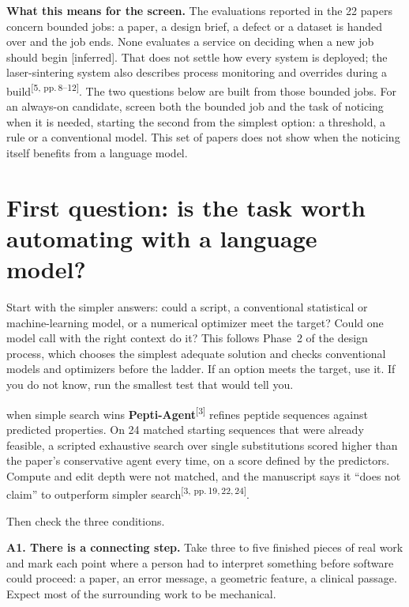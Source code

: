 \documentclass[10pt]{article}
\newcommand{\inferred}{\textsf{\small[inferred]}}
\newcommand{\p}[1]{\textsuperscript{[#1]}}
\begin{document}
\textbf{What this means for the screen.}
The evaluations reported in the 22 papers concern bounded jobs: a paper, a design brief, a defect or a dataset is handed over and the job ends. None evaluates a service on deciding when a new job should begin \inferred.
That does not settle how every system is deployed; the laser-sintering system also describes process monitoring and overrides during a build\p{5, pp.\,8--12}.
The two questions below are built from those bounded jobs.
For an always-on candidate, screen both the bounded job and the task of noticing when it is needed, starting the second from the simplest option: a threshold, a rule or a conventional model.
This set of papers does not show when the noticing itself benefits from a language model.

\section{First question: is the task worth automating with a language model?}

Start with the simpler answers: could a script, a conventional statistical or machine-learning model, or a numerical optimizer meet the target? Could one model call with the right context do it?
This follows Phase~2 of the design process, which chooses the simplest adequate solution and checks conventional models and optimizers before the ladder.
If an option meets the target, use it. If you do not know, run the smallest test that would tell you.

\begin{example}{when simple search wins}
\textbf{Pepti-Agent}\p{3} refines peptide sequences against predicted properties. On 24 matched starting sequences that were already feasible, a scripted exhaustive search over single substitutions scored higher than the paper's conservative agent every time, on a score defined by the predictors. Compute and edit depth were not matched, and the manuscript says it ``does not claim'' to outperform simpler search\p{3, pp.\,19,\,22,\,24}.
\end{example}

Then check the three conditions.

\textbf{A1. There is a connecting step.}
Take three to five finished pieces of real work and mark each point where a person had to interpret something before software could proceed: a paper, an error message, a geometric feature, a clinical passage.
Expect most of the surrounding work to be mechanical.
\end{document}
